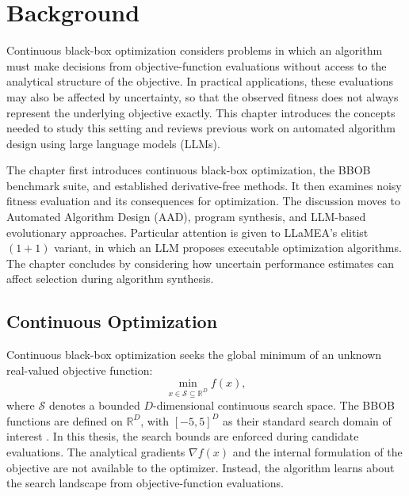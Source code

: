 
\chapter{Background}
\label{chap:background}

Continuous black-box optimization considers problems in which an algorithm
must make decisions from objective-function evaluations without access to the
analytical structure of the objective. In practical applications, these
evaluations may also be affected by uncertainty, so that the observed fitness
does not always represent the underlying objective exactly. This chapter
introduces the concepts needed to study this setting and reviews previous work
on automated algorithm design using large language models (LLMs).

The chapter first introduces continuous black-box optimization, the BBOB
benchmark suite, and established derivative-free methods. It then examines
noisy fitness evaluation and its consequences for optimization. The discussion
moves to Automated Algorithm Design (AAD), program synthesis, and LLM-based
evolutionary approaches. Particular attention is given to LLaMEA's elitist
$(1+1)$ variant, in which an LLM proposes executable optimization algorithms.
The chapter concludes by considering how uncertain performance estimates can
affect selection during algorithm synthesis.

\section{Continuous Optimization}
\label{sec:continuous_optimization}

Continuous black-box optimization seeks the global minimum of an unknown
real-valued objective function:
\begin{equation}
\label{eq:bbob_min}
    \min_{x \in \mathcal{S} \subseteq \mathbb{R}^D} f(x),
\end{equation}
where $\mathcal{S}$ denotes a bounded $D$-dimensional continuous search space.
The BBOB functions are defined on $\mathbb{R}^D$, with $[-5,5]^D$ as their
standard search domain of interest \cite{BBOB2009}. In this thesis, the
search bounds are enforced during candidate evaluations. The analytical
gradients $\nabla f(x)$ and the internal formulation of the objective are not
available to the optimizer. Instead, the algorithm learns about the search
landscape from objective-function evaluations.

